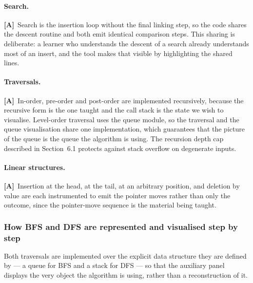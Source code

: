 \documentclass[11pt,a4paper]{article}
\newcommand{\A}{\textcolor{asmc}{\textbf{[A]}}}     %
\begin{document}
\paragraph{Search.} \A\ Search is the insertion loop without the final linking step, so the
code shares the descent routine and both emit identical comparison steps. This sharing is
deliberate: a learner who understands the descent of a search already understands most of an
insert, and the tool makes that visible by highlighting the shared lines.

\paragraph{Traversals.} \A\ In-order, pre-order and post-order are implemented recursively,
because the recursive form is the one taught and the call stack is the state we wish to
visualise. Level-order traversal uses the queue module, so the traversal and the queue
visualisation share one implementation, which guarantees that the picture of the queue is
the queue the algorithm is using. The recursion depth cap described in Section~6.1 protects
against stack overflow on degenerate inputs.

\paragraph{Linear structures.} \A\ Insertion at the head, at the tail, at an arbitrary
position, and deletion by value are each instrumented to emit the pointer moves rather than
only the outcome, since the pointer-move sequence is the material being taught.

\subsubsection{How BFS and DFS are represented and visualised step by step}

Both traversals are implemented over the explicit data structure they are defined by --- a
queue for BFS and a stack for DFS --- so that the auxiliary panel displays the very object
the algorithm is using, rather than a reconstruction of it.
\end{document}
